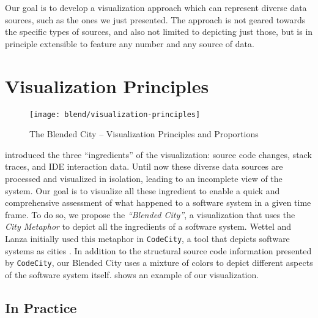 Our goal is to develop a visualization approach which can represent diverse data sources, such as the ones we just presented. The approach is not geared towards the specific types of sources, and also not limited to depicting just those, but is in principle extensible to feature any number and any source of data.



\section{Visualization Principles}\label{sec:visualization}

\begin{figure*}[ht]
\centering
\texttt{[image: blend/visualization-principles]}
\caption{The Blended City -- Visualization Principles and Proportions}
\label{fig:visualization-principles}
\end{figure*}

 introduced the three ``ingredients'' of the visualization: source code changes, stack traces, and IDE interaction data. Until now these diverse data sources are processed and visualized in isolation, leading to an incomplete view of the system. Our goal is to visualize all these ingredient to enable a quick and comprehensive assessment of what happened to a software system in a given time frame. To do so, we propose the \emph{``Blended City''}, a visualization that uses the \emph{City Metaphor} to depict all the ingredients of a software system. Wettel and Lanza initially used this metaphor in \texttt{CodeCity}, a tool that depicts software systems as cities \cite{Wett2007}. In addition to the structural source code information presented by \texttt{CodeCity}, our Blended City uses a mixture of colors to depict different aspects of the software system itself.  shows an example of our visualization.

\subsection{In Practice}

